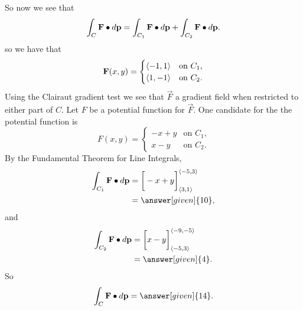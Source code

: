 \documentclass{ximera}
\begin{document}
\begin{example}
\begin{explanation}
\begin{image}
      \end{image}
      So now we see that
      \[
      \int_C \mathbf{F}\bullet\mathop{}\!d\mathbf{p} = \int_{C_1} \mathbf{F}\bullet\mathop{}\!d\mathbf{p}+\int_{C_2} \mathbf{F}\bullet\mathop{}\!d\mathbf{p}.
      \]
      so we have that
      \[
      \mathbf{F}(x,y) =
      \begin{cases}
        \left\langle -1,1\right\rangle &\text{on $C_1$,}\\
        \left\langle 1,-1\right\rangle &\text{on $C_2$.}
      \end{cases}
      \]
      Using the Clairaut gradient test we see that $\vec{F}$
       a gradient
      field when restricted to either part of $C$. Let $F$ be a
      potential function for $\vec{F}$. One candidate for the the
      potential function is
      \[
      F(x,y) =
      \begin{cases}
        -x+y  &\text{on $C_1$,}\\
        x-y  &\text{on $C_2$.}
      \end{cases}
      \]
      By the Fundamental Theorem for Line Integrals,
      \begin{align*}
        \int_{C_1} \vec{F}\dotp\d\vec{p}
        &= \eval{-x+y}_{\vector{3,1}}^{\vector{-5,3}}\\
        &= \answer[given]{10},
      \end{align*}
      and
      \begin{align*}
        \int_{C_2} \vec{F}\dotp\d\vec{p}
        &= \eval{x-y}_{\vector{-5,3}}^{\vector{-9,-5}}\\
        &= \answer[given]{4}.
      \end{align*}
      So
      \[
      \int_{C} \vec{F}\dotp\d\vec{p} = \answer[given]{14}.
      \]
  \end{explanation}
\end{example}
\end{document}
